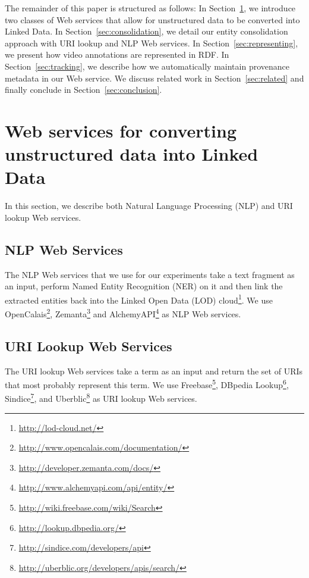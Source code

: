 \documentclass[conference]{IEEEtran}
\begin{document}
The remainder of this paper is structured as follows: In Section~\ref{sec:services}, we introduce two classes of Web
services that allow for unstructured data to be converted into Linked Data. In Section~\ref{sec:consolidation}, we
detail our entity consolidation approach with URI lookup and NLP Web services. In Section~\ref{sec:representing}, we
present how video annotations are represented in RDF. In Section~\ref{sec:tracking}, we describe how we automatically
maintain provenance metadata in our Web service. We discuss related work in Section~\ref{sec:related} and finally
conclude in Section~\ref{sec:conclusion}.


\section{Web services for converting unstructured data into Linked Data}    \label{sec:services}
In this section, we describe both Natural Language Processing (NLP) and URI lookup Web services.

\subsection{NLP Web Services}                                               \label{sec:nlp}
The NLP Web services that we use for our experiments take a text fragment as an input, perform Named Entity Recognition
(NER) on it and then link the extracted entities back into the Linked Open Data (LOD)
cloud\footnote{\url{http://lod-cloud.net/}}. We use
OpenCalais\footnote{\url{http://www.opencalais.com/documentation/}},
Zemanta\footnote{\url{http://developer.zemanta.com/docs/}} and
AlchemyAPI\footnote{\url{http://www.alchemyapi.com/api/entity/}} as NLP Web services.


\subsection{URI Lookup Web Services}                                        \label{sec:urilookup}
The URI lookup Web services take a term as an input and return the set of URIs that most probably represent this term.
We use Freebase\footnote{\url{http://wiki.freebase.com/wiki/Search}}, DBpedia
Lookup\footnote{\url{http://lookup.dbpedia.org/}}, Sindice\footnote{\url{http://sindice.com/developers/api}}, and
Uberblic\footnote{\url{http://uberblic.org/developers/apis/search/}} as URI lookup Web services.
\end{document}
